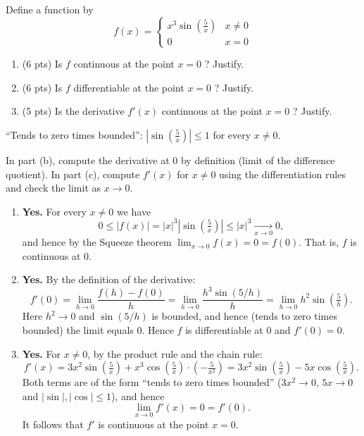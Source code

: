 
\begin{question}
Define a function by
\[ f(x)=\begin{cases} x^3 \sin(\frac{5}{x}) & x\neq 0\\ 0 & x=0 \end{cases} \]
\begin{enumerate}
  \item (6 pts) Is $f$ continuous at the point $x=0$ ? Justify.
  \item (6 pts) Is $f$ differentiable at the point $x=0$ ? Justify.
  \item (5 pts) Is the derivative $f'(x)$ continuous at the point $x=0$ ? Justify.
\end{enumerate}
\end{question}

\begin{hint}
``Tends to zero times bounded'': $\left|\sin(\frac{5}{x})\right|\le 1$ for every $x\neq 0$.
\end{hint}

\begin{hint}
In part (b), compute the derivative at $0$ by definition (limit of the difference quotient). In part (c), compute $f'(x)$ for $x\neq0$ using the differentiation rules and check the limit as $x\to 0$.
\end{hint}

\begin{solution}
\begin{enumerate}
  \item \textbf{Yes.} For every $x\neq 0$ we have
  \[ 0\le |f(x)| = |x|^3\left|\sin\left(\tfrac{5}{x}\right)\right| \le |x|^3 \xrightarrow[x\to0]{} 0, \]
  and hence by the Squeeze theorem $\lim_{x\to0} f(x)=0=f(0)$. That is, $f$ is continuous at $0$.
  \item \textbf{Yes.} By the definition of the derivative:
  \[ f'(0)=\lim_{h\to0}\frac{f(h)-f(0)}{h}=\lim_{h\to0}\frac{h^3\sin(5/h)}{h}=\lim_{h\to0} h^2\sin\left(\tfrac{5}{h}\right). \]
  Here $h^2\to0$ and $\sin(5/h)$ is bounded, and hence (tends to zero times bounded) the limit equals $0$. Hence $f$ is differentiable at $0$ and $f'(0)=0$.
  \item \textbf{Yes.} For $x\neq0$, by the product rule and the chain rule:
  \[ f'(x)=3x^2\sin\left(\tfrac{5}{x}\right)+x^3\cos\left(\tfrac{5}{x}\right)\cdot\left(-\tfrac{5}{x^2}\right)=3x^2\sin\left(\tfrac{5}{x}\right)-5x\cos\left(\tfrac{5}{x}\right). \]
  Both terms are of the form ``tends to zero times bounded'' ($3x^2\to0$, $5x\to0$ and $|\sin|,|\cos|\le1$), and hence
  \[ \lim_{x\to0}f'(x)=0=f'(0). \]
  It follows that $f'$ is continuous at the point $x=0$.
\end{enumerate}
\end{solution}
